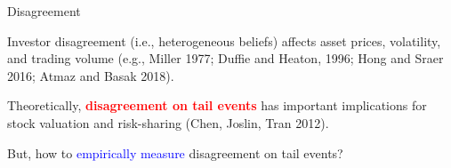 \documentclass[11pt, aspectratio=169]{beamer}
\newenvironment{wideitemize}{\itemize\addtolength{\itemsep}{10pt}}{\enditemize}
\begin{document}
\begin{frame}{Disagreement}
    \begin{wideitemize}
    \item Investor disagreement (i.e., heterogeneous beliefs) affects asset prices, volatility, and trading volume
      (e.g., Miller 1977;  Duffie and Heaton, 1996; Hong and Sraer 2016; Atmaz and Basak 2018).
   
     \item Theoretically, \textcolor{red}{\textbf{disagreement on tail events}} has important implications for stock valuation and risk-sharing (Chen, Joslin, Tran 2012).
    

    \item But, how to \textcolor{blue}{empirically measure} disagreement on tail events?
    \end{wideitemize}
\end{frame}
\end{document}
